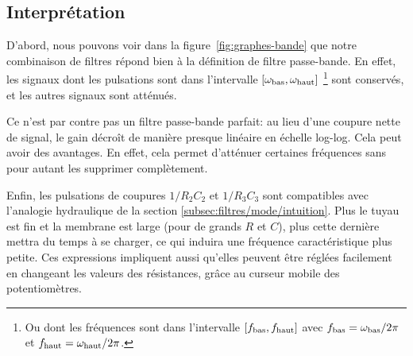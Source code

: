 \subsection{Interprétation}

D'abord, nous pouvons voir dans la figure~\ref{fig:graphes-bande}
que notre combinaison de filtres répond bien à la définition de
filtre passe-bande.
En effet, les signaux dont les pulsations sont dans l'intervalle
$[\omega_{\mathrm{bas}},\omega_{\mathrm{haut}}]$
\footnote{
    Ou dont les fréquences sont dans l'intervalle
    $[f_{\mathrm{bas}},f_{\mathrm{haut}}]$ avec
    $f_{\mathrm{bas}} = \omega_{\mathrm{bas}}/2\pi$ et
    $f_{\mathrm{haut}} = \omega_{\mathrm{haut}}/2\pi$.
}
sont conservés, et les autres signaux sont atténués.

Ce n'est par contre pas un filtre passe-bande parfait:
au lieu d'une coupure nette de signal, le gain décroît
de manière presque linéaire en échelle log-log.
Cela peut avoir des avantages.
En effet, cela permet d'atténuer certaines fréquences sans pour autant
les supprimer complètement.

Enfin, les pulsations de coupures $1/R_2C_2$ et $1/R_3C_3$
sont compatibles avec l'analogie hydraulique de la section
\ref{subsec:filtres/mode/intuition}.
Plus le tuyau est fin et la membrane est large (pour de grands $R$ et $C$),
plus cette dernière mettra du temps à se charger,
ce qui induira une fréquence caractéristique plus petite.
Ces expressions impliquent aussi qu'elles
peuvent être réglées facilement en changeant les valeurs des résistances,
grâce au curseur mobile des potentiomètres.
